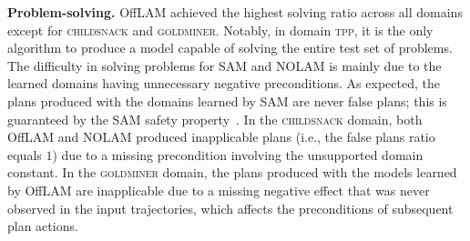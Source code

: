 \documentclass[letterpaper]{article} %
\newcommand{\nolam}{NOLAM\xspace}
\newcommand{\offlam}{OffLAM\xspace}
\newcommand{\samshort}{SAM\xspace}
\newcommand{\miniparagraph}[1]{\textbf{#1.}}
\newif\ifaddcomments
\newcommand{\roni}[1]{\ifaddcomments{\textcolor{red}{[Roni: #1]}}\fi}
\newcommand{\leo}[1]{\ifaddcomments{\textcolor{pink}{[Leonardo: #1]}}\fi}
\begin{document}
\miniparagraph{Problem-solving}  
\offlam{} achieved the highest solving ratio across all domains except for \textsc{childsnack} and \textsc{goldminer}. Notably, in domain \textsc{tpp}, it is the only algorithm to produce a model capable of solving the entire test set of problems.
The difficulty in solving problems for \samshort{} and \nolam{} is mainly due to the learned domains having unnecessary negative preconditions. 
%
As expected, the plans produced with the domains learned by \samshort are never false plans; this is guaranteed by the \samshort safety property~\cite{juba2021safe}. 
In the \textsc{childsnack} domain, both \offlam and \nolam produced inapplicable plans (i.e., the false plans ratio equals $1$) due to a missing precondition involving the unsupported domain constant.
In the \textsc{goldminer} domain, the plans produced with the models learned by \offlam{} are inapplicable due to a missing negative effect that was never observed in the input trajectories, which affects the preconditions of subsequent plan actions.
\end{document}
